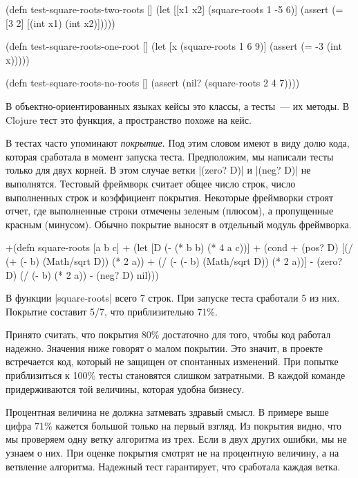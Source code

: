 \begin{english}
  \begin{clojure}
(defn test-square-roots-two-roots []
  (let [[x1 x2] (square-roots 1 -5 6)]
    (assert (= [3 2] [(int x1) (int x2)]))))

(defn test-square-roots-one-root []
  (let [x (square-roots 1 6 9)]
    (assert (= -3 (int x)))))

(defn test-square-roots-no-roots []
  (assert (nil? (square-roots 2 4 7))))
  \end{clojure}
\end{english}

В объектно-ориентированных языках кейсы это классы, а тесты~--- их методы. В
Clojure тест это функция, а пространство похоже на кейс.

В тестах часто упоминают \emph{покрытие}. Под этим словом имеют в виду долю
кода, которая сработала в момент запуска теста. Предположим, мы написали тесты
только для двух корней. В этом случае ветки \spverb|(zero? D)| и \spverb|(neg? D)|
не выполнятся. Тестовый фреймворк считает общее число строк, число выполненных строк
и коэффициент покрытия. Некоторые фреймворки строят отчет, где выполненные строки
отмечены зеленым (плюсом), а пропущенные красным (минусом). Обычно покрытие выносят
в отдельный модуль фреймворка.

\begin{english}
  \begin{diff}
+(defn square-roots [a b c]
+  (let [D (- (* b b) (* 4 a c))]
+    (cond
+      (pos? D) [(/ (+ (- b) (Math/sqrt D)) (* 2 a))
+                (/ (- (- b) (Math/sqrt D)) (* 2 a))]
-      (zero? D) (/ (- b) (* 2 a))
-      (neg? D) nil)))
  \end{diff}
\end{english}

В функции \spverb|square-roots| всего 7 строк. При запуске теста сработали 5 из
них. Покрытие составит 5/7, что приблизительно 71\%.

Принято считать, что покрытия 80\% достаточно для того, чтобы код работал
надежно. Значения ниже говорят о малом покрытии. Это значит, в проекте
встречается код, который не защищен от спонтанных изменений. При попытке
приблизиться к 100\% тесты становятся слишком затратными. В каждой команде
придерживаются той величины, которая удобна бизнесу.

Процентная величина не должна затмевать здравый смысл. В примере выше цифра 71\%
кажется большой только на первый взгляд. Из покрытия видно, что мы проверяем
одну ветку алгоритма из трех. Если в двух других ошибки, мы не узнаем о них. При
оценке покрытия смотрят не на процентную величину, а на ветвление
алгоритма. Надежный тест гарантирует, что сработала каждая ветка.

